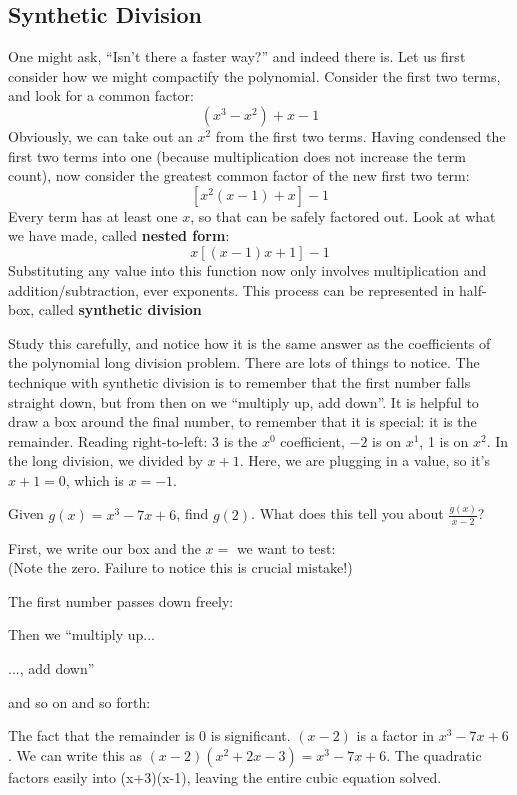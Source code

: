 \subsection{Synthetic Division}
One might ask, ``Isn't there a faster way?'' and indeed there is.  Let us first consider
how we might compactify the polynomial.  Consider the first two terms, and look for
a common factor:
$$
(x^3-x^2)+x-1
$$
Obviously, we can take out an $x^2$ from the first two terms.  Having condensed the
first two terms into one (because multiplication does not increase the term count),
now consider the greatest common factor of the new first two term:
$$
\left[x^2(x-1)+x\right]-1
$$
Every term has at least one $x$, so that can be safely factored out.  Look at what we have made,
called \textbf{nested form}:
$$
x\left[(x-1)x+1\right]-1
$$
Substituting any value into this function now only involves multiplication and addition/subtraction,
ever exponents.  This process can be represented in half-box, called \textbf{synthetic division}


Study this carefully, and notice how it is the same answer as the coefficients of the polynomial
long division problem.  There are lots of things to notice.  The technique with synthetic division is
to remember that the first number falls straight down, but from then on we  ``multiply up, add down''.  
It is helpful to draw a box around the final number, to remember that it is special: it is the remainder.  
Reading right-to-left: 3 is the $x^0$ coefficient, $-2$ is on $x^1$, 1 is on $x^2$.  
In the long division, we divided by $x + 1$.  Here, we are plugging in a value, so it's $x + 1 = 0$, 
which is $x=-1$. 

\begin{example}
\exProblem
Given $g(x) = x^3-7x+6$, find $g(2)$.  What does this tell you about $\frac{g(x)}{x-2}$?

\exSolution
First, we write our box and the $x=$ we want to test:\\


(Note the zero.  Failure to notice this is crucial mistake!)


The first number passes down freely:


Then we ``multiply up...


..., add down''


and so on and so forth:

The fact that the remainder is 0 is significant.  $(x-2)$ is a factor in $x^3-7x+6$.  We can write
this as $(x-2)(x^2+2x-3)=x^3-7x+6$.  The quadratic factors easily into (x+3)(x-1), leaving the
entire cubic equation solved.
\end{example}

